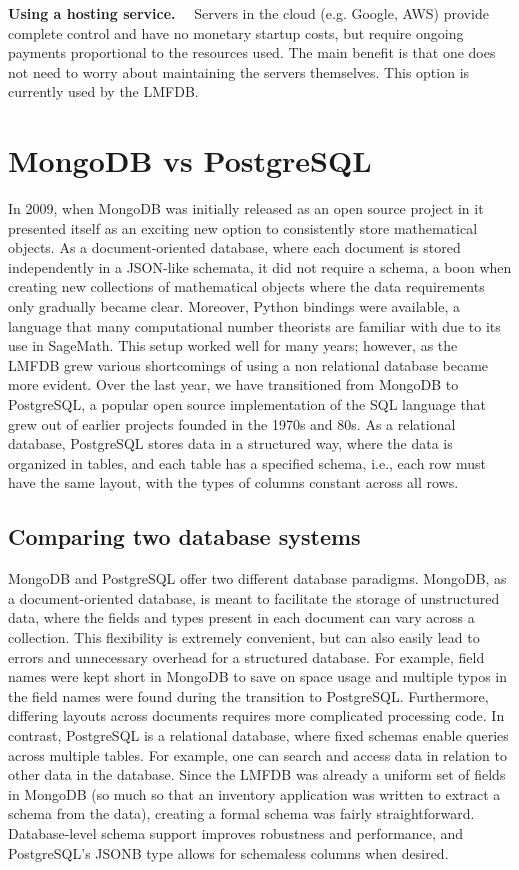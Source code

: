 \documentclass{amsart}
\newcommand{\subhead}[1]{\vspace{0.1in} \noindent \textbf{#1.}\ \ }
\begin{document}
\subhead{Using a hosting service}
    Servers in the cloud (e.g. Google, AWS) provide complete control and have no monetary startup costs, but require ongoing payments proportional to the resources used.  The main benefit is that one does not need to worry about maintaining the servers themselves.  This option is currently used by the LMFDB.


\section{MongoDB vs PostgreSQL}
\label{sec:MvsP}

In 2009, when MongoDB was initially released as an open source project in it presented itself as an exciting new option to consistently store mathematical objects.
As a document-oriented database, where each document is stored independently in a JSON-like schemata, it did not require a schema, a boon when creating new collections of mathematical objects where the data requirements only gradually became clear.
Moreover, Python bindings were available, a language that many computational number theorists are familiar with due to its use in SageMath.
This setup worked well for many years; however, as the LMFDB grew various shortcomings of using a non relational database became more evident.
Over the last year, we have transitioned from MongoDB to PostgreSQL, a popular open source implementation of the SQL language that grew out of earlier projects founded in the 1970s and 80s.
As a relational database, PostgreSQL stores data in a structured way, where the data is organized in tables, and each table has a specified schema, i.e., each row must have the same layout, with the types of columns constant across all rows.

\subsection{Comparing two database systems}

MongoDB and PostgreSQL offer two different database paradigms.
MongoDB, as a document-oriented database, is meant to facilitate the storage of unstructured data, where the fields and types present in each document can vary across a collection.
This flexibility is extremely convenient, but can also easily lead to errors and unnecessary overhead for a structured database.
For example, field names were kept short in MongoDB to save on space usage and multiple typos in the field names were found during the transition to PostgreSQL.
Furthermore, differing layouts across documents requires more complicated processing code.
In contrast, PostgreSQL is a relational database, where fixed schemas enable queries across multiple tables.
For example, one can search and access data in relation to other data in the database. 
Since the LMFDB was already a uniform set of fields in MongoDB (so much so that an inventory application was written to extract a schema from the data), creating a formal schema was fairly straightforward.
Database-level schema support improves robustness and performance, and PostgreSQL's JSONB type allows for schemaless columns when desired.
\end{document}
